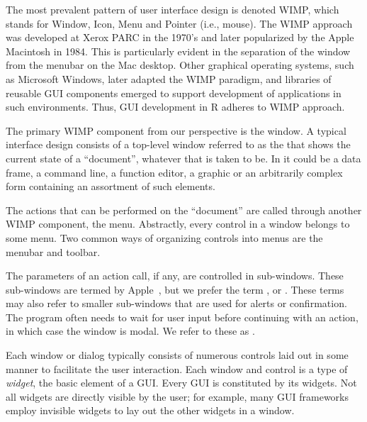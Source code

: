 



The most prevalent pattern of user interface design is denoted WIMP,
which stands for Window, Icon, Menu and Pointer (i.e., mouse). The
WIMP approach was developed at Xerox PARC in the 1970's and later
popularized by the Apple Macintosh in 1984. This is particularly
evident in the separation of the window from the menubar on the Mac
desktop. Other graphical operating systems, such as Microsoft Windows,
later adapted the WIMP paradigm, and libraries of reusable GUI
components emerged to support development of applications in such
environments. Thus, GUI development in R adheres to WIMP approach.

The primary WIMP component from our perspective is the window. A
typical interface design consists of a top-level window referred to as
the  that shows the current state of a
``document'', whatever that is taken to be. In \R\/ it could be a data
frame, a command line, a function editor, a graphic or an arbitrarily
complex form containing an assortment of such elements. 

The actions that can be performed on the ``document'' are called
through another WIMP component, the menu. Abstractly, every control in
a window belongs to some menu. Two common ways of organizing controls
into menus are the menubar and toolbar.

The parameters of an action call, if any, are controlled in
sub-windows. These sub-windows are termed 
by Apple~\citep{APPLE:HIG}, but we prefer the term ,
or . These terms may also refer to smaller
sub-windows that are used for alerts or confirmation. The program
often needs to wait for user input before continuing with an action,
in which case the window is modal. We refer to these as .

Each window or dialog typically consists of numerous controls laid out
in some manner to facilitate the user interaction. Each window and
control is a type of \textit{widget}, the basic element of a
GUI. Every GUI is constituted by its widgets. Not all widgets are
directly visible by the user; for example, many GUI frameworks employ
invisible widgets to lay out the other widgets in a window.

